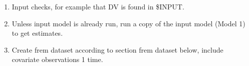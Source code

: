 \begin{enumerate}
\item Input checks, for example that DV is found in \$INPUT.

\item Unless input model is already run,
run a copy of the input model (Model 1) to get estimates.
\item Create frem dataset according to section frem dataset below, include covariate observations 1 time.


\end{enumerate}
